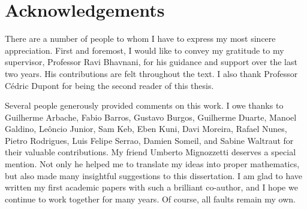 



\bigskip


\begingroup

\let\clearpage\relax
\let\cleardoublepage\relax
\let\cleardoublepage\relax

\chapter*{Acknowledgements} %
There are a number of people to whom I have to express my most sincere appreciation. First and foremost, I would like to convey my gratitude to my supervisor, Professor Ravi Bhavnani, for his guidance and support over the last two years. His contributions are felt throughout the text. I also thank Professor C\'{e}dric Dupont for being the second reader of this thesis.

Several people generously provided comments on this work. I owe thanks to Guilherme Arbache, Fabio Barros, Gustavo Burgos, Guilherme Duarte, Manoel Galdino, Le\^{o}ncio Junior, Sam Keb, Eben Kuni, Davi Moreira, Rafael Nunes, Pietro Rodrigues, Luis Felipe Serrao, Damien Someil, and Sabine Waltraut for their valuable contributions. My friend Umberto Mignozzetti deserves a special mention. Not only he helped me to translate my ideas into proper mathematics, but also made many insightful suggestions to  this dissertation. I am glad to have written my first academic papers with such a brilliant co-author, and I hope we continue to work together for many years. Of course, all faults remain my own.

